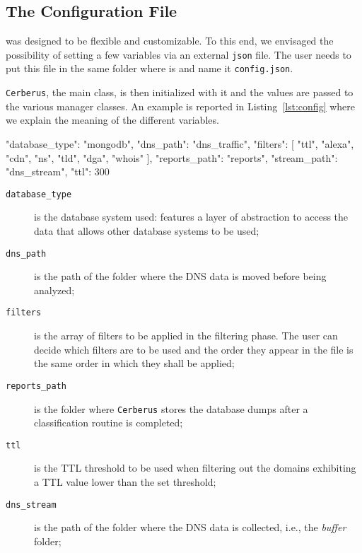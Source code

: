 \subsection{The Configuration File} %
\label{sub:the_configuration_file}
\thesystem was designed to be flexible and customizable. To this end,
we envisaged the possibility of setting a few variables via an external \texttt{json}
file. The user needs to put this file in the same folder where \thesystem is and
name it \texttt{config.json}.

\texttt{Cerberus}, the main class, is then initialized with it and the values are
passed to the various manager classes.
An example is reported in Listing~\ref{lst:config} where we explain the meaning
of the different variables.

\begin{pyglist}[language=json,caption={\thesystem' configuration file.},label=lst:config]
{
    "database_type": "mongodb",
    "dns_path": "dns_traffic",
    "filters": [
        "ttl",
        "alexa",
        "cdn",
        "ns",
        "tld",
        "dga",
        "whois"
    ],
    "reports_path": "reports",
    "stream_path": "dns_stream",
    "ttl": 300
}
\end{pyglist}

\begin{description}
    \item[\texttt{database\_type}] is the database system used: \thesystem
        features a layer of abstraction to access the data that allows other
        database systems to be used;
    \item[\texttt{dns\_path}] is the path of the folder where the DNS
        data is moved before being analyzed;
    \item[\texttt{filters}] is the array of filters to be applied in the
        filtering phase. The user can decide which filters are to be used
        and the order they appear in the file is the same order in which they
        shall be applied;
    \item[\texttt{reports\_path}] is the folder where \texttt{Cerberus} stores
        the database dumps after a classification routine is completed;
    \item[\texttt{ttl}] is the TTL threshold to be used when filtering out
        the domains exhibiting a TTL value lower than the set threshold;
    \item[\texttt{dns\_stream}] is the path of the folder where the DNS
        data is collected, i.e., the \emph{buffer} folder;
\end{description}

